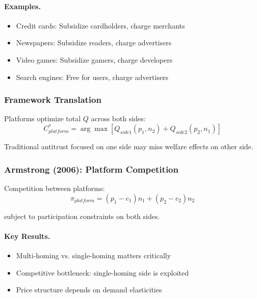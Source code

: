 \paragraph{Examples.}
\begin{itemize}
    \item Credit cards: Subsidize cardholders, charge merchants
    \item Newspapers: Subsidize readers, charge advertisers
    \item Video games: Subsidize gamers, charge developers
    \item Search engines: Free for users, charge advertisers
\end{itemize}

\subsubsection{Framework Translation}

Platforms optimize total $Q$ across both sides:
\begin{equation}
C^*_{platform} = \arg\max [Q_{side1}(p_1, n_2) + Q_{side2}(p_2, n_1)]
\end{equation}

Traditional antitrust focused on one side may miss welfare effects on other side.

\subsubsection{Armstrong (2006): Platform Competition}

Competition between platforms:
\begin{equation}
\pi_{platform} = (p_1 - c_1)n_1 + (p_2 - c_2)n_2
\end{equation}

subject to participation constraints on both sides.

\paragraph{Key Results.}
\begin{itemize}
    \item Multi-homing vs. single-homing matters critically
    \item Competitive bottleneck: single-homing side is exploited
    \item Price structure depends on demand elasticities
\end{itemize}

